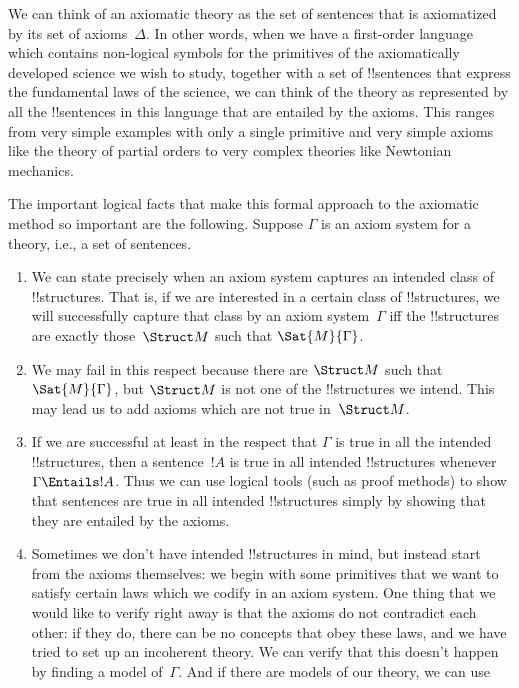 \documentclass[../../include/open-logic-section]{subfiles}
\begin{document}
\begin{explain}
We can think of an axiomatic theory as the set of sentences that is
axiomatized by its set of axioms~$\Delta$.  In other words, when we
have a first-order language which contains non-logical symbols for the
primitives of the axiomatically developed science we wish to study,
together with a set of !!{sentence}s that express the fundamental laws
of the science, we can think of the theory as represented by all the
!!{sentence}s in this language that are entailed by the axioms. This
ranges from very simple examples with only a single primitive and very
simple axioms like the theory of partial orders to very complex
theories like Newtonian mechanics.

The important logical facts that make this formal approach to the 
axiomatic method so important are the following. Suppose $\Gamma$ is
an axiom system for a theory, i.e., a set of sentences.
\begin{enumerate}
\item We can state precisely when an axiom system captures an intended
  class of !!{structure}s.  That is, if we are interested in a certain
  class of !!{structure}s, we will successfully capture that class by
  an axiom system~$\Gamma$ iff the !!{structure}s are exactly
  those~$\Struct M$ such that $\Sat{M}{\Gamma}$.
\item We may fail in this respect because there are $\Struct M$ such
  that $\Sat{M}{\Gamma}$, but $\Struct M$ is not one of the
  !!{structure}s we intend. This may lead us to add axioms which are
  not true in~$\Struct M$.
\item If we are successful at least in the respect that $\Gamma$ is
  true in all the intended !!{structure}s, then a sentence~$!A$ is true in
  all intended !!{structure}s whenever $\Gamma \Entails !A$.  Thus we can
  use logical tools (such as proof methods) to show that sentences are
  true in all intended !!{structure}s simply by showing that they are
  entailed by the axioms.
\item Sometimes we don't have intended !!{structure}s in mind, but instead
  start from the axioms themselves: we begin with some primitives that
  we want to satisfy certain laws which we codify in an axiom system.
  One thing that we would like to verify right away is that the axioms
  do not contradict each other: if they do, there can be no concepts
  that obey these laws, and we have tried to set up an incoherent
  theory. We can verify that this doesn't happen by finding a model
  of~$\Gamma$.  And if there are models of our theory, we can use

\end{enumerate}
\end{explain}
\end{document}
